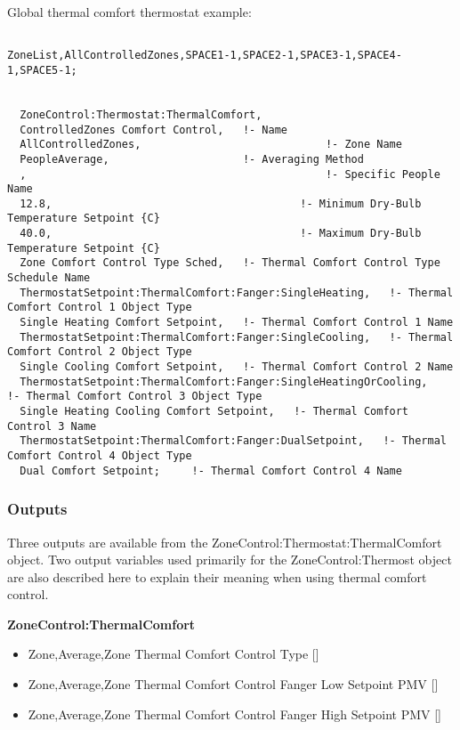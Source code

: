 Global thermal comfort thermostat example:

\begin{lstlisting}

ZoneList,AllControlledZones,SPACE1-1,SPACE2-1,SPACE3-1,SPACE4-1,SPACE5-1;


  ZoneControl:Thermostat:ThermalComfort,
  ControlledZones Comfort Control,   !- Name
  AllControlledZones,                             !- Zone Name
  PeopleAverage,                     !- Averaging Method
  ,                                               !- Specific People Name
  12.8,                                       !- Minimum Dry-Bulb Temperature Setpoint {C}
  40.0,                                       !- Maximum Dry-Bulb Temperature Setpoint {C}
  Zone Comfort Control Type Sched,   !- Thermal Comfort Control Type Schedule Name
  ThermostatSetpoint:ThermalComfort:Fanger:SingleHeating,   !- Thermal Comfort Control 1 Object Type
  Single Heating Comfort Setpoint,   !- Thermal Comfort Control 1 Name
  ThermostatSetpoint:ThermalComfort:Fanger:SingleCooling,   !- Thermal Comfort Control 2 Object Type
  Single Cooling Comfort Setpoint,   !- Thermal Comfort Control 2 Name
  ThermostatSetpoint:ThermalComfort:Fanger:SingleHeatingOrCooling,   !- Thermal Comfort Control 3 Object Type
  Single Heating Cooling Comfort Setpoint,   !- Thermal Comfort Control 3 Name
  ThermostatSetpoint:ThermalComfort:Fanger:DualSetpoint,   !- Thermal Comfort Control 4 Object Type
  Dual Comfort Setpoint;     !- Thermal Comfort Control 4 Name
\end{lstlisting}

\subsubsection{Outputs}\label{outputs-3-024}

Three outputs are available from the ZoneControl:Thermostat:ThermalComfort object. Two output variables used primarily for the ZoneControl:Thermost object are also described here to explain their meaning when using thermal comfort control.

\textbf{ZoneControl:ThermalComfort}

\begin{itemize}
\item
  Zone,Average,Zone Thermal Comfort Control Type {[]}
\item
  Zone,Average,Zone Thermal Comfort Control Fanger Low Setpoint PMV {[]}
\item
  Zone,Average,Zone Thermal Comfort Control Fanger High Setpoint PMV {[]}
\end{itemize}

